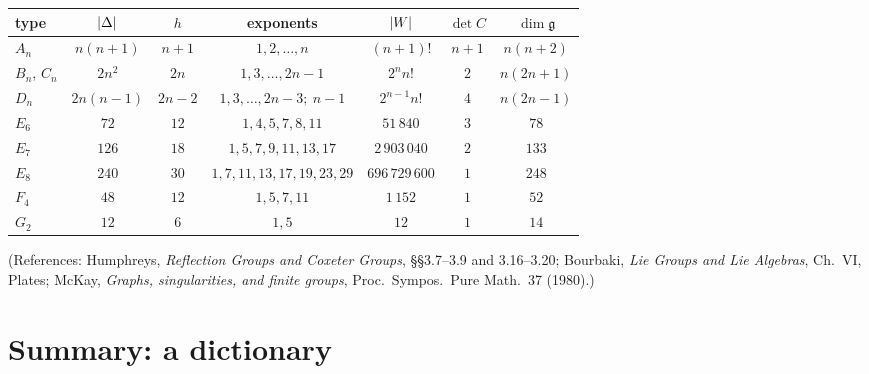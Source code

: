 \begin{center}
\renewcommand{\arraystretch}{1.2}
\small
\begin{tabular}{lcccccc}
\toprule
type & $\left\lvert \Delta \right\rvert$ & $h$ & exponents & $\left\lvert W \right\rvert$ & $\det C$ & $\dim\mathfrak g$\\
\midrule
$A_n$ & $n(n+1)$ & $n+1$ & $1,2,\dots,n$ & $(n+1)!$ & $n+1$ & $n(n+2)$\\
$B_n$, $C_n$ & $2n^2$ & $2n$ & $1,3,\dots,2n-1$ & $2^nn!$ & $2$ & $n(2n+1)$\\
$D_n$ & $2n(n-1)$ & $2n-2$ & $1,3,\dots,2n-3;\ n-1$ & $2^{n-1}n!$ & $4$ & $n(2n-1)$\\
$E_6$ & $72$ & $12$ & $1,4,5,7,8,11$ & $51\,840$ & $3$ & $78$\\
$E_7$ & $126$ & $18$ & $1,5,7,9,11,13,17$ & $2\,903\,040$ & $2$ & $133$\\
$E_8$ & $240$ & $30$ & $1,7,11,13,17,19,23,29$ & $696\,729\,600$ & $1$ & $248$\\
$F_4$ & $48$ & $12$ & $1,5,7,11$ & $1\,152$ & $1$ & $52$\\
$G_2$ & $12$ & $6$ & $1,5$ & $12$ & $1$ & $14$\\
\bottomrule
\end{tabular}
\end{center}
(References: Humphreys, \emph{Reflection Groups and Coxeter Groups}, \S\S3.7--3.9 and 3.16--3.20; Bourbaki,
\emph{Lie Groups and Lie Algebras}, Ch.~VI, Plates; McKay, \emph{Graphs, singularities, and finite
groups}, Proc.\ Sympos.\ Pure Math.\ 37 (1980).)

\section{Summary: a dictionary}
\label{LIE:sec:dictionary}

